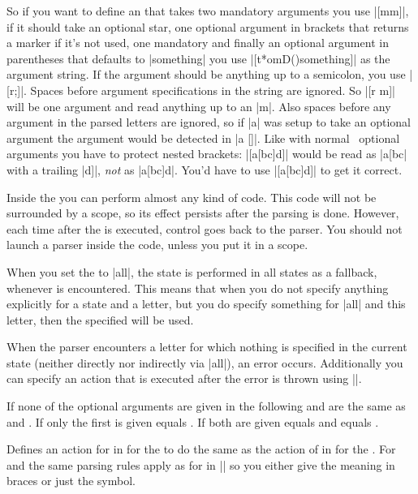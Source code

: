 \begin{command}
    So if you want to define an  that takes two mandatory
    arguments you use |[mm]|, if it should take an optional star, one optional
    argument in brackets that returns a marker if it's not used, one mandatory
    and finally an optional argument in parentheses that defaults to
    |something| you use |[t*omD(){something}]| as the argument string. If the
    argument should be anything up to a semicolon, you use |[r;]|. Spaces
    before argument specifications in the string are ignored. So |[r m]| will
    be one argument and read anything up to an |m|. Also spaces before any
    argument in the parsed letters are ignored, so if |a| was setup to take an
    optional argument the argument would be detected in |a []|. Like with
    normal \LaTeXe\ optional arguments you have to protect nested brackets:
    |[a[bc]d]| would be read as |a[bc| with a trailing |d]|, \emph{not} as
    |a[bc]d|. You'd have to use |[{a[bc]d}]| to get it correct.

    Inside the  you can perform almost any kind of code. This code
    will not be surrounded by a scope, so its effect persists after the parsing
    is done. However, each time after the  is executed, control
    goes back to the parser. You should not launch a parser inside the
     code, unless you put it in a scope.

    When you set the  to |all|, the state  is
    performed in all states as a fallback, whenever  is
    encountered. This means that when you do not specify anything explicitly
    for a state and a letter, but you do specify something for |all| and this
    letter, then the specified  will be used.

    When the parser encounters a letter for which nothing is specified in the
    current state (neither directly nor indirectly via |all|), an error occurs.
    Additionally you can specify an action that is executed after the error is
    thrown using |\pgfparserdefunknown|.
\end{command}%

\begin{command}%
    {%
        \pgfparserlet
    }%
    If none of the optional arguments are given in the following
     and  are the same as
     and . If only the first is given
     equals . If both are given 
    equals  and  equals .

    Defines an action for  in  for the
     to do the same as the action of
     in  for the . For
     and  the same parsing rules
    apply as for  in |\pgfparserdef| so you either give
    the meaning in braces or just the symbol.
\end{command}%

